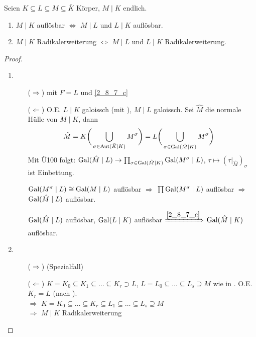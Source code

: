 \begin{lemma}
	Seien $K\subseteq L\subseteq M\subseteq \bar K$ Körper, $M\mid K$ endlich.
	\begin{enumerate}[label={\alph*)}]
		\item $M\mid K$ auflösbar $\Leftrightarrow$ $M\mid L$ und $L\mid K$ auflösbar.
		\item $M\mid K$ Radikalerweiterung $\Leftrightarrow$ $M\mid L$ und $L\mid K$ Radikalerweiterung.
	\end{enumerate}
\end{lemma}

\begin{proof}
	\leavevmode
	\begin{enumerate}[topsep=-6pt,label={\alph*)}]
		\item \begin{itemize}
			\item[($\Rightarrow$)]  mit $F=L$ und \cref{2_8_7_c}
			\item[($\Leftarrow$)] O.E. $L\mid K$ galoissch (mit ), $M\mid L$ galoissch. Sei $\hat M$ die normale Hülle von $M\mid K$, dann \begin{align*}
				\hat M &= K\bigg( \bigcup_{\sigma\in\operatorname{Aut}(\bar K\mid K)} M^\sigma\bigg) = L\bigg( \bigcup_{\sigma\in\operatorname{Gal}(\hat M\mid K)} M^\sigma\bigg)
			\end{align*}
			Mit Ü100 folgt: $\operatorname{Gal}(\hat M\mid L)\rightarrow\prod_{\sigma\in\operatorname{Gal}(\hat M\mid K)} \operatorname{Gal}(M^\sigma\mid L)$, $\tau\mapsto (\tau|_{\hat M})_{\sigma}$ ist Einbettung.
			
			$\operatorname{Gal} (M^\sigma\mid L)\cong \operatorname{Gal}(M\mid L)$ auflösbar $\Rightarrow$ $\prod \operatorname{Gal}(M^\sigma\mid L)$ auflösbar $\Rightarrow$ $\operatorname{Gal}(\hat M\mid L)$ auflösbar.
			
			$\operatorname{Gal}(\hat M\mid L)$ auflösbar, $\operatorname{Gal}(L\mid K)$ auflösbar $\xRightarrow{\ref{2_8_7_c}}$ $\operatorname{Gal}(\hat M\mid K)$ auflösbar.
		\end{itemize}
		\item \begin{itemize}
			\item[($\Rightarrow$)]  (Spezialfall)
			\item[($\Leftarrow$)] $K = K_0 \subseteq K_1\subseteq \dots\subseteq K_r \supset L$, $L = L_0\subseteq \dots\subseteq L_s\supseteq M$ wie in . O.E. $K_r = L$ (nach ).\\
			\hspace*{0.5em}$\Rightarrow$ $K = K_0 \subseteq \dots\subseteq K_r \subseteq L_1\subseteq \dots\subseteq L_s \supseteq M$ \\
			\hspace*{0.5em}$\Rightarrow$ $M\mid K$ Radikalerweiterung
		\end{itemize}
	\end{enumerate}
\end{proof}

